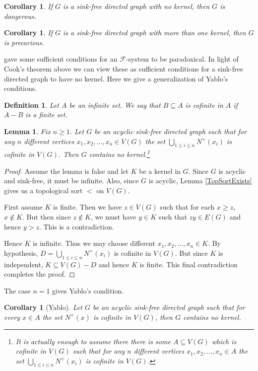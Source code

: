 \documentclass[12pt]{kluwer}
\newtheorem{lem}[thm]{Lemma}
\newtheorem{cor}[thm]{Corollary}
\newtheorem{defn}{Definition}
\theoremstyle{remark}
\newcommand{\fancy}[1]{\mathcal{#1}}
\def\F{\fancy{F}}
\def\F{\fancy{F}}
\begin{document}
\begin{cor}
If $G$ is a sink-free directed graph with no kernel, then $G$ is dangerous.
\end{cor}

\begin{cor}
If $G$ is a sink-free directed graph with more than one kernel, then $G$ is precarious.
\end{cor}

\cite{yablo06} gave some sufficient conditions for an $\F$-system to be paradoxical.  In light of Cook's theorem above we can view these as sufficient conditions for a sink-free directed graph to have no kernel.  Here we give a generalization of Yablo's conditions.

\begin{defn}
Let $A$ be an infinite set. We say that $B \subseteq A$ is \emph{cofinite} in $A$ if $A - B$ is a finite set.
\end{defn}

\begin{lem}\label{GeneralizedYabloCondition}
Fix $n \geq 1$.  Let $G$ be an acyclic sink-free directed graph such that for any $n$ different vertices $x_1, x_2, \ldots, x_n \in V(G)$ the set $\bigcup_{1 \leq i \leq n} N^+(x_i)$ is cofinite in $V(G)$.  Then $G$ contains no kernel.\footnote{It is actually enough to assume there there is some $A \subseteq V(G)$ which is cofinite in $V(G)$ such that for any $n$ different vertices $x_1, x_2, \ldots, x_n \in A$ the set $\bigcup_{1 \leq i \leq n} N^+(x_i)$ is cofinite in $V(G)$.}
\end{lem}
\begin{proof}
Assume the lemma is false and let $K$ be a kernel in $G$.  Since $G$ is acyclic and sink-free, it must be infinite.  Also, since $G$ is acyclic, Lemma \ref{TopSortExists} gives us a topological sort $<$ on $V(G)$. 

First assume $K$ is finite.  Then we have $z \in V(G)$ such that for each $x \geq z$, $x \not \in K$.  But then since $z \not \in K$, we must have $y \in K$ such that $zy \in E(G)$ and hence $y > z$. This is a contradiction.

Hence $K$ is infinite. Thus we may choose different $x_1, x_2, \ldots, x_n \in K$.  By hypothesis, $D = \bigcup_{1 \leq i \leq n} N^+(x_i)$ is cofinite in $V(G)$.  But since $K$ is independent, $K \subseteq V(G) - D$ and hence $K$ is finite.  This final contradiction completes the proof.
\end{proof}

The case $n = 1$ gives Yablo's condition.
\begin{cor}[Yablo]
Let $G$ be an acyclic sink-free directed graph such that for every $x \in A$ the set $N^+(x)$ is cofinite in $V(G)$, then $G$ contains no kernel.
\end{cor}
\end{document}
